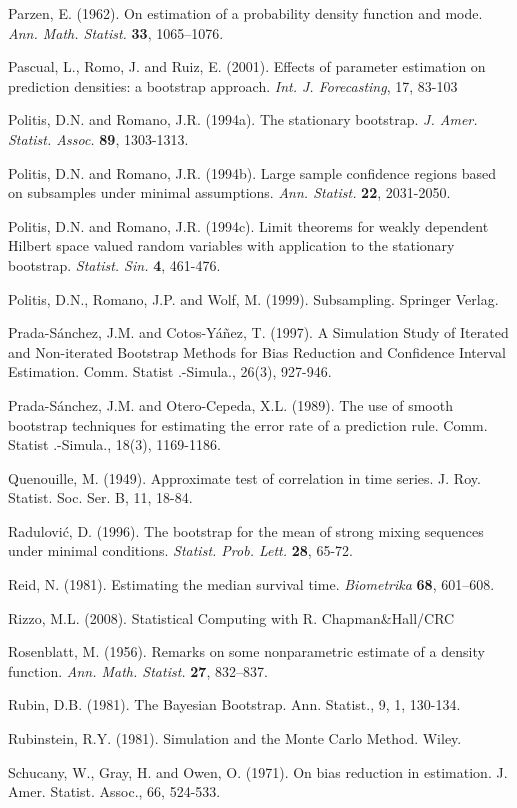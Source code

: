 \documentclass[]{book}
\theoremstyle{definition}
\theoremstyle{definition}
\theoremstyle{definition}
\theoremstyle{remark}
\begin{document}
Parzen, E. (1962). On estimation of a probability density function and
mode. \emph{Ann. Math. Statist.} \textbf{33}, 1065--1076.

Pascual, L., Romo, J. and Ruiz, E. (2001). Effects of parameter
estimation on prediction densities: a bootstrap approach. \emph{Int. J.
Forecasting}, 17, 83-103

Politis, D.N. and Romano, J.R. (1994a). The stationary bootstrap.
\emph{J. Amer. Statist. Assoc.} \textbf{89}, 1303-1313.

Politis, D.N. and Romano, J.R. (1994b). Large sample confidence regions
based on subsamples under minimal assumptions. \emph{Ann. Statist.}
\textbf{22}, 2031-2050.

Politis, D.N. and Romano, J.R. (1994c). Limit theorems for weakly
dependent Hilbert space valued random variables with application to the
stationary bootstrap. \emph{Statist. Sin.} \textbf{4}, 461-476.

Politis, D.N., Romano, J.P. and Wolf, M. (1999). Subsampling. Springer
Verlag.

Prada-Sánchez, J.M. and Cotos-Yáñez, T. (1997). A Simulation Study of
Iterated and Non-iterated Bootstrap Methods for Bias Reduction and
Confidence Interval Estimation. Comm. Statist .-Simula., 26(3), 927-946.

Prada-Sánchez, J.M. and Otero-Cepeda, X.L. (1989). The use of smooth
bootstrap techniques for estimating the error rate of a prediction rule.
Comm. Statist .-Simula., 18(3), 1169-1186.

Quenouille, M. (1949). Approximate test of correlation in time series.
J. Roy. Statist. Soc. Ser. B, 11, 18-84.

Radulović, D. (1996). The bootstrap for the mean of strong mixing
sequences under minimal conditions. \emph{Statist. Prob. Lett.}
\textbf{28}, 65-72.

Reid, N. (1981). Estimating the median survival time. \emph{Biometrika}
\textbf{68}, 601--608.

Rizzo, M.L. (2008). Statistical Computing with R. Chapman\&Hall/CRC

Rosenblatt, M. (1956). Remarks on some nonparametric estimate of a
density function. \emph{Ann. Math. Statist.} \textbf{27}, 832--837.

Rubin, D.B. (1981). The Bayesian Bootstrap. Ann. Statist., 9, 1,
130-134.

Rubinstein, R.Y. (1981). Simulation and the Monte Carlo Method. Wiley.

Schucany, W., Gray, H. and Owen, O. (1971). On bias reduction in
estimation. J. Amer. Statist. Assoc., 66, 524-533.
\end{document}
